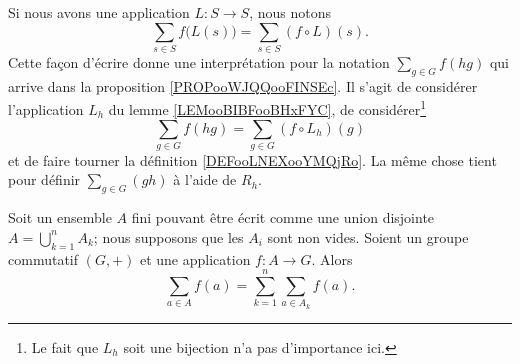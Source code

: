 Si nous avons une application \( L\colon S\to S\), nous notons
\begin{equation}
	\sum_{s\in S}f\big( L(s) \big)=\sum_{s\in S}(f\circ L)(s).
\end{equation}
Cette façon d'écrire donne une interprétation pour la notation \( \sum_{g\in G}f(hg)\) qui arrive dans la proposition \ref{PROPooWJQQooFINSEc}. Il s'agit de considérer l'application \( L_h\) du lemme \ref{LEMooBIBFooBHxFYC}, de considérer\footnote{Le fait que \( L_h\) soit une bijection n'a pas d'importance ici.}
\begin{equation}        \label{EQooQQBEooFDOBVG}
	\sum_{g\in G}f(hg)=\sum_{g\in G}(f\circ L_h)(g)
\end{equation}
et de faire tourner la définition \ref{DEFooLNEXooYMQjRo}. La même chose tient pour définir \( \sum_{g\in G}(gh)\) à l'aide de \( R_h\).


\begin{lemma}
	Soit un ensemble \( A\) fini pouvant être écrit comme une union disjointe \( A=\bigcup_{k=1}^nA_k\); nous supposons que les \( A_i\) sont non vides. Soient un groupe commutatif \( (G,+)\) et une application \( f\colon A\to G\). Alors
	\begin{equation}
		\sum_{a\in A}f(a)=\sum_{k=1}^n\sum_{a\in A_k}f(a).
	\end{equation}
\end{lemma}


